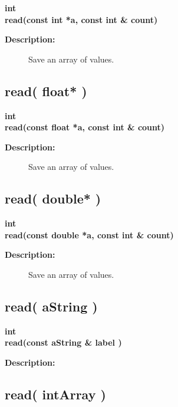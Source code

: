 \begin{flushleft} \textbf{%
int  \\ 
\settowidth{\FortranIOIncludeArgIndent}{read(}%
read(const int *a, const int \& count)
}\end{flushleft}
\begin{description}
\item[{\bf Description:}] 
   Save an array of values.
\end{description}
\subsection{read( float* )}
 
\begin{flushleft} \textbf{%
int  \\ 
\settowidth{\FortranIOIncludeArgIndent}{read(}%
read(const float *a, const int \& count)
}\end{flushleft}
\begin{description}
\item[{\bf Description:}] 
   Save an array of values.
\end{description}
\subsection{read( double* )}
 
\begin{flushleft} \textbf{%
int  \\ 
\settowidth{\FortranIOIncludeArgIndent}{read(}%
read(const double *a, const int \& count)
}\end{flushleft}
\begin{description}
\item[{\bf Description:}] 
   Save an array of values.
\end{description}
\subsection{read( aString )}
 
\begin{flushleft} \textbf{%
int  \\ 
\settowidth{\FortranIOIncludeArgIndent}{read(}%
read(const aString \& label )
}\end{flushleft}
\begin{description}
\item[{\bf Description:}] 
\end{description}
\subsection{read( intArray )}
 
